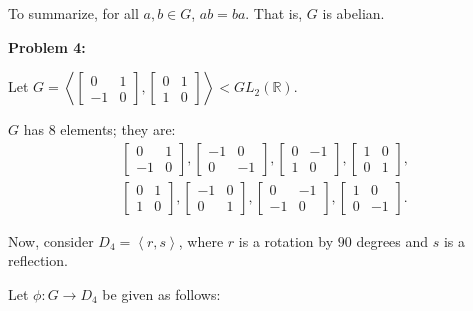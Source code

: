 \documentclass[a4paper,12pt]{article}
\newcommand{\shunt}{\vspace{20mm}}
\newcommand{\R}{\mathbb{R}}
\begin{document}
To summarize, for all $a, b \in G$, $ab= ba$. That is, $G$ is abelian.

\shunt

{\bf Problem 4:}

Let $G = \left\langle\left[\begin{smallmatrix}0&1\\ -1&0 \end{smallmatrix}\right],\left[\begin{smallmatrix}0&1\\ 1&0 \end{smallmatrix}\right] \right\rangle < GL_2(\R)$.

$G$ has $8$ elements; they are:
\begin{align*}
&\left[\begin{smallmatrix}0&1\\ -1&0 \end{smallmatrix}\right],
\left[\begin{smallmatrix}-1&0\\ 0&-1 \end{smallmatrix}\right],
\left[\begin{smallmatrix}0&-1\\ 1&0 \end{smallmatrix}\right],
\left[\begin{smallmatrix}1&0\\ 0&1 \end{smallmatrix}\right],\\
&\left[\begin{smallmatrix}0&1\\ 1&0 \end{smallmatrix}\right],
\left[\begin{smallmatrix}-1&0\\ 0&1 \end{smallmatrix}\right],
\left[\begin{smallmatrix}0&-1\\ -1&0 \end{smallmatrix}\right],
\left[\begin{smallmatrix}1&0\\ 0&-1 \end{smallmatrix}\right].
\end{align*}

Now, consider $D_4 = \left\langle r, s \right\rangle$, where $r$ is a rotation by $90$ degrees and $s$ is a reflection.

Let $\phi : G \to D_4$ be given as follows:
\end{document}

